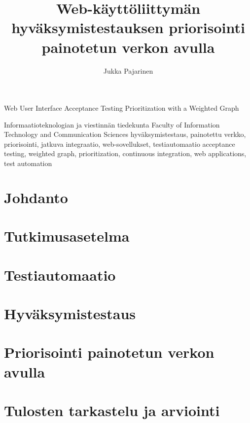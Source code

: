 \documentclass{config/tauthesis}
\theoremstyle{definition}
\begin{document}
\frontmatter
\title
  {Web-käyttöliittymän hyväksymistestauksen priorisointi painotetun verkon avulla}
  {Web User Interface Acceptance Testing Prioritization with a Weighted Graph}
\subtitle{}{}
\author{Jukka Pajarinen}
\facultyname
  {Informaatioteknologian ja viestinnän tiedekunta}
  {Faculty of Information Technology and Communication Sciences}
\keywords
  {hyväksymistestaus, painotettu verkko, priorisointi, jatkuva integraatio, web-sovellukset, testiautomaatio}
  {acceptance testing, weighted graph, prioritization, continuous integration, web applications, test automation}
\maketitle
{}
\tableofcontents
\listoffigures
\listoftables
\glossary

\mainmatter
\chapter{Johdanto} \label{ch:05_johdanto}
  
\chapter{Tutkimusasetelma} \label{ch:06_tutkimusasetelma}
  
\chapter{Testiautomaatio} \label{ch:07_testiautomaatio}
  
\chapter{Hyväksymistestaus} \label{ch:08_hyvaksymistestaus}
  
\chapter{Priorisointi painotetun verkon avulla} \label{ch:09_priorisointi_painotetun_verkon_avulla}
  
\chapter{Tulosten tarkastelu ja arviointi} \label{ch:10_tulosten_tarkastelu_ja_arviointi}
  
\end{document}
